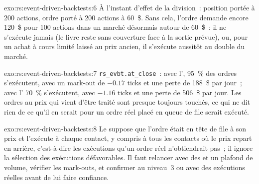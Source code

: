 \begin{solution}{exo:rs:event-driven-backtests:6}
À l'instant d'effet de la division~: position portée à 200 actions, ordre porté à 200 actions à 60~\$. Sans cela, l'ordre demande encore 120~\$ pour 100 actions dans un marché
désormais autour de 60~\$~: il ne s'exécute jamais (le livre reste sans couverture face à la sortie prévue), ou, pour un achat à cours limité laissé au prix ancien, il s'exécute aussitôt au double
du marché.
\end{solution}

\begin{solution}{exo:rs:event-driven-backtests:7}
\texttt{rs\_evbt.at\_close}~: avec l', 95~\% des ordres s'exécutent, avec un mark-out de $-0.17$ ticks et une perte de 188~\$ par jour~; avec l'
70~\% s'exécutent, avec $-1.16$ ticks et une perte de 506~\$ par jour. Les ordres au prix qui vient d'être traité sont presque toujours touchés, ce qui ne dit rien de ce qu'il en serait pour un
ordre réel placé en queue de file serait exécuté.
\end{solution}

\begin{solution}{exo:rs:event-driven-backtests:8}
Le  suppose que l'ordre était en tête de file à son prix et l'exécute à chaque contact, y compris à tous les contacts où le prix repart en
arrière, c'est-à-dire les exécutions qu'un ordre réel n'obtiendrait pas~; il ignore la sélection des exécutions défavorables. Il faut relancer avec des  et un plafond de volume, vérifier les mark-outs,
et confirmer au niveau~3 ou avec des exécutions réelles avant de lui faire confiance.
\end{solution}

